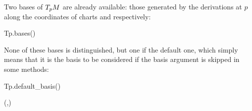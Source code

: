 Two bases of $T_pM$ are already available: those generated by the derivations
at $p$ along the coordinates of charts  and  respectively:
\begin{NBin}
Tp.bases()
\end{NBin}
\begin{NBoutM}
\end{NBoutM}
None of these bases is distinguished, but one if the default one, which
simply means that it is the basis to be considered if the basis argument
is skipped in some methods:
\begin{NBin}
Tp.default_basis()
\end{NBin}
\begin{NBoutM}
\left(,\right)
\end{NBoutM}

